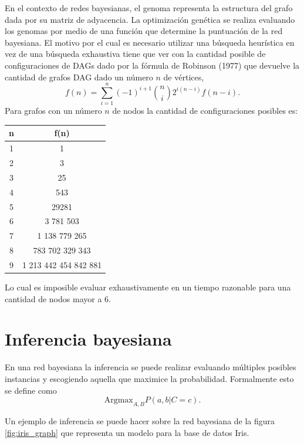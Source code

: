 \documentclass[10pt,a4paper]{article}
\begin{document}
En el contexto de redes bayesianas, el genoma representa la estructura del grafo dada por su matriz de adyacencia. La optimización genética se realiza evaluando los genomas por medio de una función que determine la puntuación de la red bayesiana. El motivo por el cual es necesario utilizar una búsqueda heurística en vez de una búsqueda exhaustiva tiene que ver con la cantidad posible de configuraciones de DAGs dado por la fórmula de Robinson (1977) \cite{Robinson1977} que devuelve la cantidad de grafos DAG dado un número $n$ de  vértices,
\[
	f(n) = \sum_{i=1}^n (-1)^{i+1} \binom{n}{i} 2^{i(n-i)} f(n-i).
\]
Para grafos con un número $n$ de nodos la cantidad de configuraciones posibles es:

\begin{table}[H]
\centering
\begin{tabular}{|c|c|}
\hline 
n & f(n) \\ 
\hline 
1 & 1 \\ 
\hline 
2 & 3 \\ 
\hline 
3 & 25 \\ 
\hline 
4 & 543 \\ 
\hline 
5 & 29281 \\ 
\hline 
6 & 3 781 503 \\ 
\hline 
7 & 1 138 779 265 \\ 
\hline 
8 & 783 702 329 343 \\ 
\hline 
9 & 1 213 442 454 842 881 \\ 
\hline 
\end{tabular}
\end{table}

Lo cual es imposible evaluar exhaustivamente en un tiempo razonable para una cantidad de nodos mayor a 6.

\section{Inferencia bayesiana} \label{sec:inf}
En una red bayesiana la inferencia se puede realizar evaluando múltiples posibles instancias y escogiendo aquella que maximice la probabilidad. Formalmente esto se define como
\[
	\text{Argmax}_{A,B} P(a,b | C = c) .
\]

Un ejemplo de inferencia se puede hacer sobre la red bayesiana de la figura \ref{fig:iris_graph} que representa un modelo para la base de datos Iris.
\end{document}
